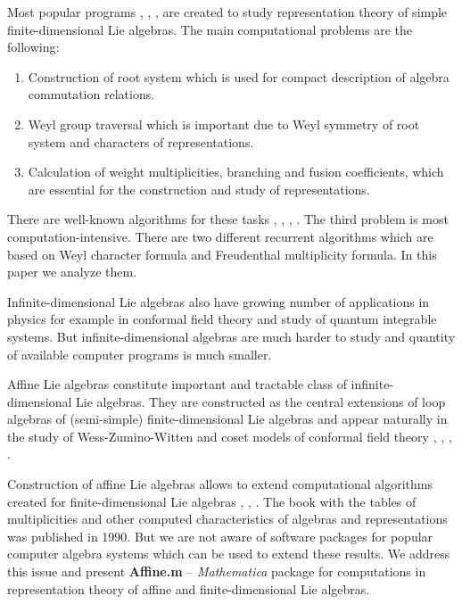 \documentclass[preprint,12pt]{elsarticle}
\begin{document}
Most popular programs \cite{simplie}, \cite{vanleeuwen1994lsp}, \cite{fischbacher2002ilp}, \cite{coxweyl} are created to study representation theory of simple finite-dimensional Lie algebras. The main computational problems are the following:
\begin{enumerate}
\item Construction of root system which is used for compact description of algebra commutation relations.
\item Weyl group traversal which is important due to Weyl symmetry of root system and characters of representations.
\item Calculation of weight multiplicities, branching and fusion coefficients, which are essential for the construction and study of representations. 
\end{enumerate}
There are well-known algorithms for these tasks \cite{moody1982fast}, \cite{stembridge2001computational}, \cite{belinfante1989survey}, \cite{casselman1994machine}. 
The third problem is most computation-intensive. There are two different recurrent algorithms which are based on Weyl character formula and Freudenthal multiplicity formula. In this paper we analyze them. 

Infinite-dimensional Lie algebras also have growing number of applications in physics for example in conformal field theory and study of quantum integrable systems. But infinite-dimensional algebras are much harder to study and quantity of available computer programs is much smaller.

Affine Lie algebras \cite{kac1990idl} constitute important and tractable class of infinite-dimensional Lie algebras. They are constructed as the central extensions of loop algebras of (semi-simple) finite-dimensional Lie algebras and appear naturally in the study of Wess-Zumino-Witten and coset models of conformal field theory \cite{Walton:1999xc}, \cite{difrancesco1997cft}, \cite{Goddard198588}, \cite{Dunbar:1992gh}. 

Construction of affine Lie algebras allows to extend computational algorithms created for finite-dimensional Lie algebras  \cite{Fuchs:1996dd}, \cite{gannon2001algorithms}, \cite{kass1990ala}. The book \cite{kass1990ala} with the tables of multiplicities and other computed characteristics of algebras and representations was published in 1990. But we are not aware of software packages for popular computer algebra systems which can be used to extend these results. 
We address this issue and present {\bf Affine.m} -- {\it Mathematica} package for computations in representation theory of affine and finite-dimensional Lie algebras. 
\end{document}

